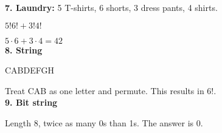 \documentclass[english,openany]{book}
\begin{document}
    \textbf{7. Laundry:} 5 T-shirts, 6 shorts, 3 dress pants, 4 shirts.

    $5!6! + 3!4!$

    $5 \cdot 6 + 3 \cdot 4 = 42$\\

    \textbf{8. String}

    CABDEFGH

    Treat CAB as one letter and permute. This results in $6!$.\\

    \textbf{9. Bit string}

    Length 8, twice as many 0s than 1s. The answer is 0.
\end{document}

